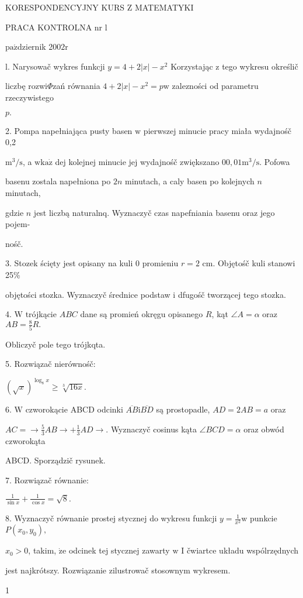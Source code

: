 \documentclass[a4paper,12pt]{article}
\begin{document}
KORESPONDENCYJNY KURS Z MATEMATYKI

PRACA KONTROLNA nr l

$\mathrm{p}\mathrm{a}\acute{\mathrm{z}}$dziernik 2$002\mathrm{r}$

l. Narysowač wykres funkcji $y=4+2|x|-x^{2}$ Korzystając $\mathrm{z}$ tego wykresu określič

liczbę rozwi$\Phi$zań równania $4+2|x|-x^{2}=p\mathrm{w}$ zalezności od parametru rzeczywistego

$p.$

2. Pompa napełniająca pusty basen $\mathrm{w}$ pierwszej minucie pracy miała wydajnośč 0,2

$\mathrm{m}^{3}/\mathrm{s}$, a $\mathrm{w}\mathrm{k}\mathrm{a}\dot{\mathrm{z}}$ dej kolejnej minucie jej wydajnośč zwiększano $00,01 \mathrm{m}^{3}/\mathrm{s}$. Pofowa

basenu zostala napełniona po $2n$ minutach, a caly basen po kolejnych $n$ minutach,

gdzie $n$ jest liczbą naturalnq. Wyznaczyč czas napefniania basenu oraz jego pojem-

nośč.

3. Stozek ścięty jest opisany na kuli $0$ promieniu $r=2$ cm. Objętośč kuli stanowi 25\%

objętości stozka. Wyznaczyč średnice podstaw $\mathrm{i}$ dfugośč tworzącej tego stozka.

4. $\mathrm{W}$ trójkącie $ABC$ dane są promień okręgu opisanego $R$, kąt $\angle A=\alpha$ oraz $AB=\displaystyle \frac{8}{5}R.$

Obliczyč pole tego trójkqta.

5. Rozwiązač nierównośč:

$(\sqrt{x})^{\log_{8}x}\geq\sqrt[3]{16x}.$

6. $\mathrm{W}$ czworokącie ABCD odcinki $\overline{AB}\mathrm{i}\overline{BD}$ są prostopadle, $AD = 2AB =a$ oraz

$ AC=\rightarrow \displaystyle \frac{5}{3}AB\rightarrow+\frac{1}{3}AD\rightarrow$. Wyznaczyč cosinus kąta $\angle BCD=\alpha$ oraz obwód czworokąta

ABCD. Sporządzič rysunek.

7. Rozwiązač równanie:

$\displaystyle \frac{1}{\sin x}+\frac{1}{\cos x}=\sqrt{8}.$

8. Wyznaczyč równanie prostej stycznej do wykresu funkcji $y=\displaystyle \frac{1}{x^{2}}\mathrm{w}$ punkcie $P(x_{0},y_{0}),$

$x_{0}>0$, takim, $\dot{\mathrm{z}}\mathrm{e}$ odcinek tej stycznej zawarty $\mathrm{w}$ I čwiartce układu wspólrzędnych

jest najkrótszy. Rozwiązanie zilustrowač stosownym wykresem.

1
\end{document}
